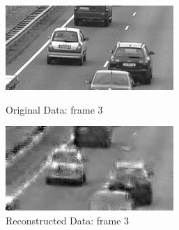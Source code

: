 \documentclass[12pt]{article}
\begin{document}
\begin{itemize}
\begin{enumerate}
    \begin{figure}[H]
        \centering
        \begin{minipage}{.45\textwidth}
            \centering
            \includegraphics[width=\linewidth]{results/cars_7_orig_3.png}
            \caption*{Original Data: frame 3}
        \end{minipage}
        \begin{minipage}{.45\textwidth}
            \centering
            \includegraphics[width=\linewidth]{results/cars_7_recon_3.png}
            \caption*{Reconstructed Data: frame 3}
        \end{minipage}
    \end{figure}


\end{enumerate}
\end{itemize}
\end{document}
